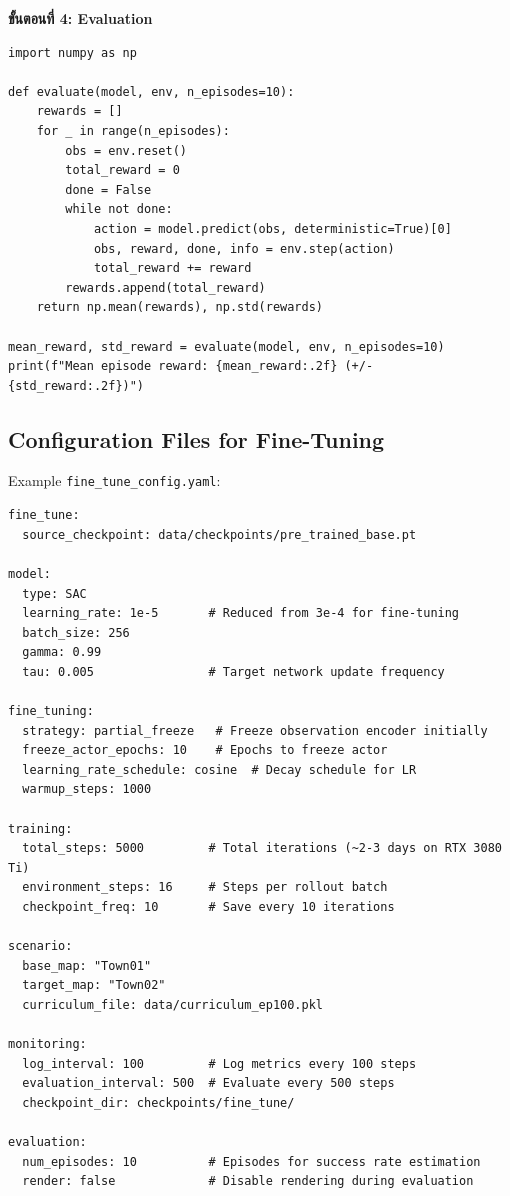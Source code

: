 \documentclass[10pt,a4paper,twocolumn]{article}
\begin{document}
\textbf{ขั้นตอนที่ 4: Evaluation}
\begin{verbatim}
import numpy as np

def evaluate(model, env, n_episodes=10):
    rewards = []
    for _ in range(n_episodes):
        obs = env.reset()
        total_reward = 0
        done = False
        while not done:
            action = model.predict(obs, deterministic=True)[0]
            obs, reward, done, info = env.step(action)
            total_reward += reward
        rewards.append(total_reward)
    return np.mean(rewards), np.std(rewards)

mean_reward, std_reward = evaluate(model, env, n_episodes=10)
print(f"Mean episode reward: {mean_reward:.2f} (+/- {std_reward:.2f})")
\end{verbatim}

\subsection{Configuration Files for Fine-Tuning}

Example \texttt{fine\_tune\_config.yaml}:
\begin{verbatim}
fine_tune:
  source_checkpoint: data/checkpoints/pre_trained_base.pt
  
model:
  type: SAC
  learning_rate: 1e-5       # Reduced from 3e-4 for fine-tuning
  batch_size: 256
  gamma: 0.99
  tau: 0.005                # Target network update frequency
  
fine_tuning:
  strategy: partial_freeze   # Freeze observation encoder initially
  freeze_actor_epochs: 10    # Epochs to freeze actor
  learning_rate_schedule: cosine  # Decay schedule for LR
  warmup_steps: 1000
  
training:
  total_steps: 5000         # Total iterations (~2-3 days on RTX 3080 Ti)
  environment_steps: 16     # Steps per rollout batch
  checkpoint_freq: 10       # Save every 10 iterations
  
scenario:
  base_map: "Town01"
  target_map: "Town02"
  curriculum_file: data/curriculum_ep100.pkl
  
monitoring:
  log_interval: 100         # Log metrics every 100 steps
  evaluation_interval: 500  # Evaluate every 500 steps
  checkpoint_dir: checkpoints/fine_tune/

evaluation:
  num_episodes: 10          # Episodes for success rate estimation
  render: false             # Disable rendering during evaluation
\end{verbatim}
\end{document}
